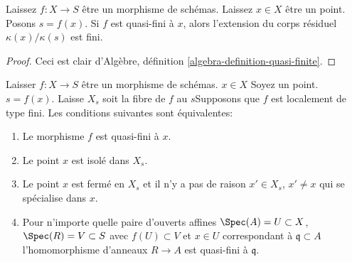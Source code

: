 \begin{lemma}

\label{lemma-residue-field-quasi-finite}
Laissez $f : X \to S$ être un morphisme de schémas. Laissez $x \in X$ être un point. Posons $s = f(x)$. Si $f$ est quasi-fini à $x$, alors l'extension du corps résiduel $\kappa(x)/\kappa(s)$ est fini.
\end{lemma}

\begin{proof}
Ceci est clair d'Algèbre, définition \ref{algebra-definition-quasi-finite}.
\end{proof}

\begin{lemma}

\label{lemma-quasi-finite-at-point-characterize}

Laisser $f : X \to S$ être un morphisme de schémas. $x \in X$ Soyez un point. $s = f(x)$. Laisse $X_s$ soit la fibre de $f$ au $s$Supposons que $f$ est localement de type fini. Les conditions suivantes sont équivalentes:

\begin{enumerate}

\item Le morphisme $f$ est quasi-fini à $x$.
\item Le point $x$ est isolé dans $X_s$.
\item Le point $x$ est fermé en $X_s$
et il n'y a pas de raison $x' \in X_s$, $x' \not = x$
qui se spécialise dans $x$.
\item Pour n'importe quelle paire d'ouverts affines
$\Spec(A) = U \subset X$, $\Spec(R) = V \subset S$ avec
$f(U) \subset V$ et $x \in U$ correspondant à $\mathfrak q \subset A$
l'homomorphisme d'anneaux $R \to A$ est quasi-fini à $\mathfrak q$.

\end{enumerate}

\end{lemma}

